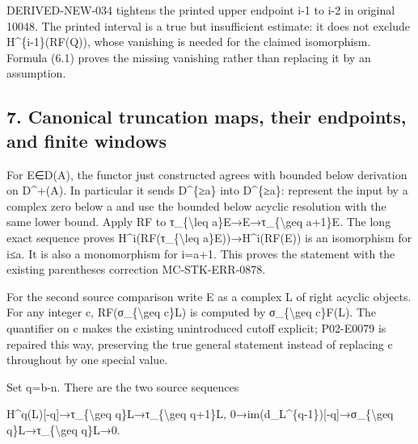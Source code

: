 DERIVED-NEW-034 tightens the printed upper endpoint i-1 to i-2 in original 10048. The printed interval is a true but insufficient estimate:\allowbreak{} it does not exclude H\textasciicircum{}\{i-1\}(RF(Q)\allowbreak{})\allowbreak{},\allowbreak{} whose vanishing is needed for the claimed isomorphism. Formula (6.1)\allowbreak{} proves the missing vanishing rather than replacing it by an assumption.

\subsection{\texorpdfstring{7. Canonical truncation maps,\allowbreak{} their endpoints,\allowbreak{} and finite windows}{7. Canonical truncation  their  and finite windows}}\label{proofs-9746-10132-canonical-truncation-maps-their-endpoints-and-finite-windows}

For E\allowbreak{}∈D(A)\allowbreak{},\allowbreak{} the functor just constructed agrees with bounded below derivation on D\textasciicircum{}\allowbreak{}+(A)\allowbreak{}. In particular it sends D\^{}\{≥a\} into D\textasciicircum{}\{≥a\}:\allowbreak{} represent the input by a complex zero below a and use the bounded below acyclic resolution with the same lower bound. Apply RF to τ\_\allowbreak{}\{\textbackslash{}leq a\}E\allowbreak{}→E\allowbreak{}→τ\_\allowbreak{}\{\textbackslash{}geq a\allowbreak{}+1\}E. The long exact sequence proves H\textasciicircum{}i(RF(τ\_\allowbreak{}\{\textbackslash{}leq a\}E)\allowbreak{})\allowbreak{}\allowbreak{}→H\textasciicircum{}i(RF(E)\allowbreak{})\allowbreak{} is an isomorphism for i≤a. It is also a monomorphism for i\allowbreak{}=a\allowbreak{}+1. This proves the statement with the existing parentheses correction MC-STK-ERR-0878.

For the second source comparison write E as a complex L of right acyclic objects. For any integer c,\allowbreak{} RF(σ\_\allowbreak{}\{\textbackslash{}geq c\}L)\allowbreak{} is computed by σ\_\allowbreak{}\{\textbackslash{}geq c\}F(L)\allowbreak{}. The quantifier on c makes the existing unintroduced cutoff explicit; P02-E0079 is repaired this way,\allowbreak{} preserving the true general statement instead of replacing c throughout by one special value.

Set q\allowbreak{}=b-n. There are the two source sequences

H\textasciicircum{}q(L)\allowbreak{}[-q]\allowbreak{}\allowbreak{}→τ\_\allowbreak{}\{\textbackslash{}geq q\}L\allowbreak{}→τ\_\allowbreak{}\{\textbackslash{}geq q\allowbreak{}+1\}L,\allowbreak{} 0\allowbreak{}→im(d\_\allowbreak{}L\textasciicircum{}\{q-1\})\allowbreak{}[-q]\allowbreak{}\allowbreak{}→σ\_\allowbreak{}\{\textbackslash{}geq q\}L\allowbreak{}→τ\_\allowbreak{}\{\textbackslash{}geq q\}L\allowbreak{}→0.

